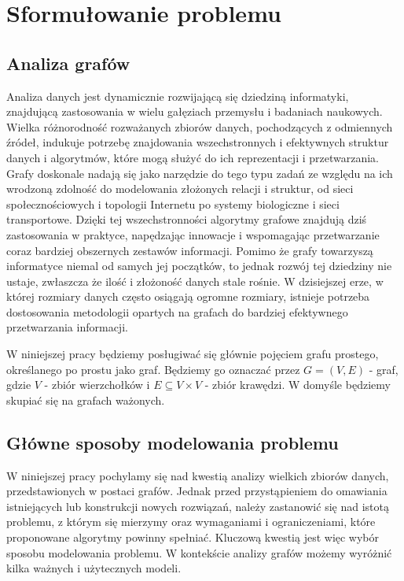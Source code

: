 \chapter{Sformułowanie problemu}

\section{Analiza grafów}

    Analiza danych jest dynamicznie rozwijającą się dziedziną informatyki, znajdującą zastosowania w wielu gałęziach przemysłu i badaniach naukowych. Wielka różnorodność rozważanych zbiorów danych, pochodzących z odmiennych źródeł, indukuje potrzebę znajdowania wszechstronnych i efektywnych struktur danych i algorytmów, które mogą służyć do ich reprezentacji i przetwarzania. Grafy doskonale nadają się jako narzędzie do tego typu zadań ze względu na ich wrodzoną zdolność do modelowania złożonych relacji i struktur, od sieci społecznościowych i topologii Internetu po systemy biologiczne i sieci transportowe. Dzięki tej wszechstronności algorytmy grafowe znajdują dziś zastosowania w praktyce, napędzając innowacje i wspomagając przetwarzanie coraz bardziej obszernych zestawów informacji. Pomimo że grafy towarzyszą informatyce niemal od samych jej początków, to jednak rozwój tej dziedziny nie ustaje, zwłaszcza że ilość i złożoność danych stale rośnie. W dzisiejszej erze, w której rozmiary danych często osiągają ogromne rozmiary, istnieje potrzeba dostosowania metodologii opartych na grafach do bardziej efektywnego przetwarzania informacji. 

    W niniejszej pracy będziemy posługiwać się głównie pojęciem grafu prostego, określanego po prostu jako graf. Będziemy go oznaczać przez $G = (V,E)$ - graf, gdzie $V$ - zbiór wierzchołków i $E \subseteq V \times V$ - zbiór krawędzi. W domyśle będziemy skupiać się na grafach ważonych.

\section{Główne sposoby modelowania problemu}
    W niniejszej pracy pochylamy się nad kwestią analizy wielkich zbiorów danych, przedstawionych w postaci grafów. Jednak przed przystąpieniem do omawiania istniejących lub konstrukcji nowych rozwiązań, należy zastanowić się nad istotą problemu, z którym się mierzymy oraz wymaganiami i ograniczeniami, które proponowane algorytmy powinny spełniać. Kluczową kwestią jest więc wybór sposobu modelowania problemu. W kontekście analizy grafów możemy wyróżnić kilka ważnych i użytecznych modeli.

